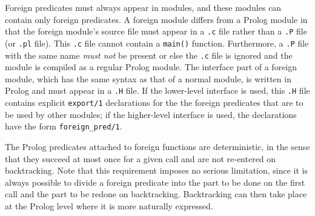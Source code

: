 Foreign predicates must always appear in modules, and these modules
can contain only foreign predicates.  A foreign module differs from a
Prolog module in that the foreign module's source file must appear in
a {\tt *.c} file rather than a {\tt *.P} file (or {\tt .pl} file).
This {\tt *.c} file cannot contain a {\tt main()} function.
Furthermore, a {\tt *.P} file with the same name {\em must not} be
present or else the {\tt *.c} file is ignored and the module is
compiled as a regular Prolog module.  The interface part of a foreign
module, which has the same syntax as that of a normal module, is
written in Prolog and must appear in a {\tt *.H} file.  If the
lower-level interface is used, this {\tt *.H} file contains explicit
{\tt export/1} declarations for the the foreign predicates that are to
be used by other modules; if the higher-level interface is used, the
declarations have the form {\tt foreign\_pred/1}.

The Prolog predicates attached to foreign functions are deterministic,
in the sense that they succeed at most once for a given call and are
not re-entered on backtracking.  Note that this requirement imposes no
serious limitation, since it is always possible to divide a foreign
predicate into the part to be done on the first call and the part to
be redone on backtracking.  Backtracking can then take place at the
Prolog level where it is more naturally expressed.


